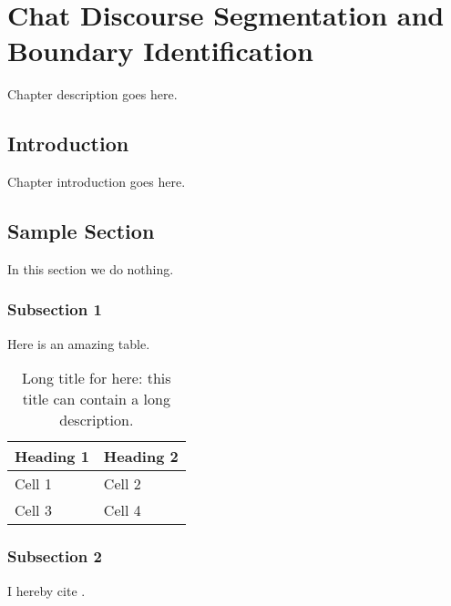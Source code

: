 
\chapter{Chat Discourse Segmentation and Boundary Identification} %
\label{ch:TM}

\begin{textsl}
{\small Chapter description goes here.}
\end{textsl}

\vspace*{1cm}




\section{Introduction}
Chapter introduction goes here.

\section{Sample Section}
In this section we do nothing.
\subsection{Subsection 1}
Here is an amazing table.
\begin{table}
 \centering
 \begin{tabular}{ | l l | }
 \hline
  \textbf{Heading 1} & \textbf{Heading 2} \\ \hline
   Cell 1 & Cell 2 \\
   Cell 3 & Cell 4 \\ \hline
 \end{tabular}
 \caption [Short title for list of tables]{Long title for here: this title can contain a long description.}
 \label{tbl:dt_chi2}
\end{table}
\subsection{Subsection 2}
I hereby cite \cite{ref1}.

